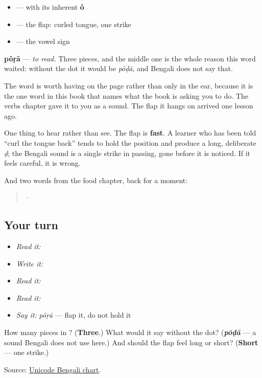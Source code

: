 \begin{itemize}
\raggedright
  \item \textbf{} — with its inherent \textbf{ô}
  \item \textbf{} — the flap: curled tongue, one strike
  \item \textbf{} — the vowel sign
\end{itemize}

\textbf{pôṛā} — \emph{to read.} Three pieces, and the middle one is the whole reason this word waited: without the dot it would be \emph{pôḍā}, and Bengali does not say that.

The word is worth having on the page rather than only in the ear, because it is the one word in this book that names what the book is asking you to do. The verbs chapter gave it to you as a sound. The flap it hangs on arrived one lesson ago.

One thing to hear rather than see. The flap is \textbf{fast}. A learner who has been told \textquotedblleft{}curl the tongue back\textquotedblright{} tends to hold the position and produce a long, deliberate \emph{ḍ}; the Bengali sound is a single strike in passing, gone before it is noticed. If it feels careful, it is wrong.

And two words from the food chapter, back for a moment:

\begin{quote}
\textbf{} · \textbf{}
\end{quote}

\subsection*{Your turn}
\begin{itemize}
\raggedright
  \item \emph{Read it:} 
  \item \emph{Write it:} 
  \item \emph{Read it:} 
  \item \emph{Read it:} 
  \item \emph{Say it:} \emph{pôṛā} — flap it, do not hold it
\end{itemize}

\begin{tcolorbox}[breakable,colback=teal!4,colframe=teal!35!black,title={Before you move on}]
How many pieces in \textbf{}? (\textbf{Three}.) What would it say without the dot? (\emph{\textbf{pôḍā}} — a sound Bengali does not use here.) And should the flap feel long or short? (\textbf{Short} — one strike.)

Source: \href{https://www.unicode.org/charts/PDF/U0980.pdf}{Unicode Bengali chart}.
\end{tcolorbox}
